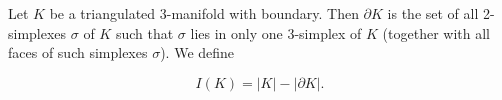Let $K$ be a triangulated 3-manifold with boundary. Then $\partial K$ is the set of all 2-simplexes $\sigma$ of $K$ such that $\sigma$ lies in only one 3-simplex of $K$ (together with all faces of such simplexes $\sigma$). We define

$$I(K) = |K| - |\partial K|.$$
